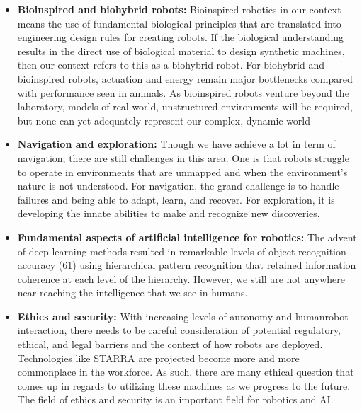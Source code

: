 \documentclass[conference]{IEEEtran}
\begin{document}
\begin{itemize}
\item \textbf{Bioinspired and biohybrid robots:} Bioinspired robotics in our context means the  use of fundamental biological principles that are translated into engineering design rules for creating robots. If the biological understanding results in the direct use of biological material to design synthetic machines, then our context refers to this as a biohybrid robot. For biohybrid and bioinspired robots, actuation and energy remain major bottlenecks compared with performance seen in animals. As bioinspired robots venture beyond the laboratory, models of real-world, unstructured environments will be required, but none can yet adequately represent our complex, dynamic world
\item \textbf{Navigation and exploration:} Though we have achieve a lot in term of navigation, there are still challenges in this area. One is that robots struggle to operate in environments that are unmapped and when the environment's nature is not understood\autocite{yang2018grand}. For navigation, the grand challenge is to handle failures and being able to adapt, learn, and recover. For exploration, it is developing the innate abilities to make and recognize new discoveries.
\item \textbf{Fundamental aspects of artificial intelligence for robotics:} The advent of deep learning methods resulted in remarkable levels of object recognition accuracy (61) using hierarchical pattern recognition that retained information coherence at each level of the hierarchy. However, we still are not anywhere near reaching the intelligence that we see in humans.
\item \textbf{Ethics and security:} With increasing levels of autonomy and humanrobot interaction, there needs to be careful consideration of potential regulatory, ethical, and legal barriers and the context of how robots are deployed. Technologies like STARRA are projected become more and more commonplace in the workforce. As such, there are many ethical question that comes up in regards to utilizing these machines as we progress to the future. The field of ethics and security is an important field for robotics and AI.
\end{itemize}

\newpage{}
\printbibliography{}
\end{document}
